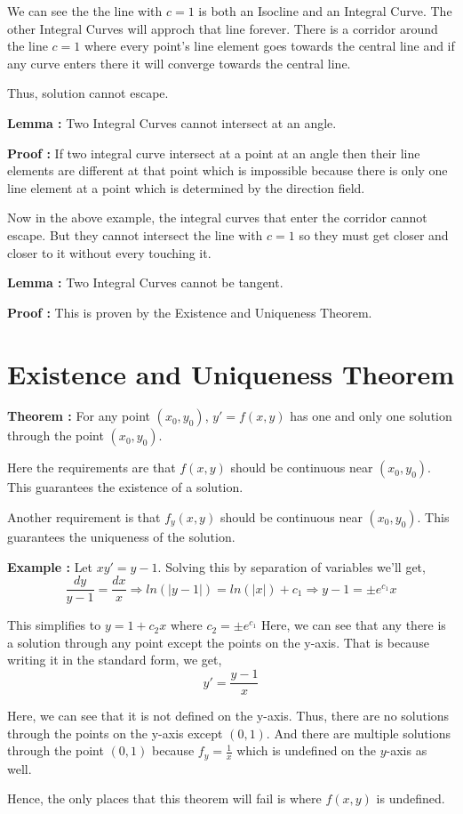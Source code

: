 We can see the the line with $c = 1$ is both an Isocline and an Integral Curve.
The other Integral Curves will approch that line forever.
There is a corridor around the line  $c = 1$ where every point's line element goes towards the central line 
and if any curve enters there it will converge towards the central line.

Thus, solution cannot escape.
\begin{mdframed}
{\bf Lemma : } Two Integral Curves cannot intersect at an angle.

{\bf Proof : } If two integral curve intersect at a point at an angle then their line elements are different at that point which is impossible 
because there is only one line element at a point which is determined by the direction field.        
\end{mdframed}

Now in the above example, the integral curves that enter the corridor cannot escape.
But they cannot intersect the line with $c = 1$ so they must get closer and closer to it without every touching it.

\begin{mdframed}
{\bf Lemma : } Two Integral Curves cannot be tangent.

{\bf Proof : } This is proven by the Existence and Uniqueness Theorem.
\end{mdframed}


\section{Existence and Uniqueness Theorem}

\begin{mdframed}
{\bf Theorem : } For any point $(x_0, y_0)$, $y' = f(x, y)$ has one and only one solution through the point $(x_0, y_0)$.
\end{mdframed}

Here the requirements are that $f(x, y)$ should be continuous near $(x_0, y_0)$.
This guarantees the existence of a solution.

Another requirement is that $f_y(x, y)$ should be continuous near $(x_0, y_0)$.
This guarantees the uniqueness of the solution.


{\bf Example : } Let $xy' = y - 1$.
Solving this by separation of variables we'll get,
$$ \frac{dy}{y-1} = \frac{dx}{x} 
\Rightarrow 
ln(|y-1|) = ln(|x|) + c_1 
\Rightarrow
y - 1 = \pm e^{c_1} x 
$$

This simplifies to $y = 1 + c_2x$ where $c_2 = \pm e^{c_1}$
Here, we can see that any there is a solution through any point except the points on the y-axis.
That is because writing it in the standard form, we get, $$y' = \frac{y-1}{x}$$

Here,  we can see that it is not defined on the y-axis. 
Thus, there are no solutions through the points on the y-axis except $(0, 1)$.
And there are multiple solutions through the point $(0, 1)$ because $f_y = \frac{1}{x}$ which is undefined on the $y$-axis as well.


Hence, the only places that this theorem will fail is where $f(x, y)$ is undefined.